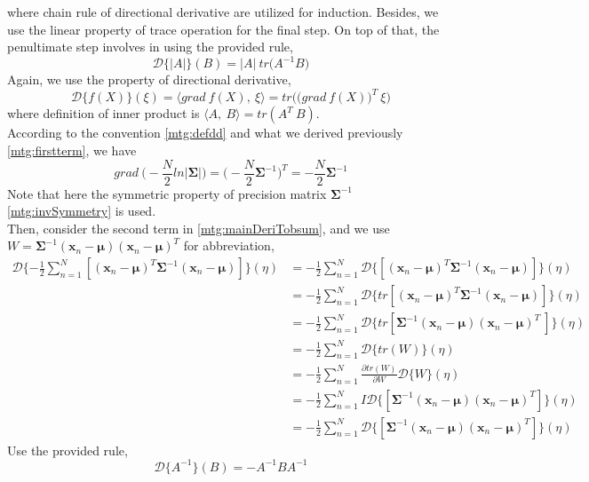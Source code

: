 \documentclass[11pt,a4paper]{article}
\newcommand{\htab}{\hspace*{0.63cm}}
\newcommand{\dd}[2]{\mathcal{D}\{ #1 \} (#2)}
\newcommand{\bmu}{\boldsymbol{\mu}}
\newcommand{\bsum}{\boldsymbol{\Sigma}}
\newcommand{\xnv}{\boldsymbol{x}_{n} }
\begin{document}
\htab where chain rule of directional derivative are utilized for induction. Besides, we use the linear property of trace operation for the final step. On top of that, the penultimate step involves in using the provided rule, 
    \begin{equation} 
        \dd{|A|}{B} = |A|\ tr \big(A^{-1} B\big)
    \end{equation}
\htab Again, we use the property of directional derivative,
    \begin{equation} \label{mtg:defdd}
        \dd{f(X)}{\xi} = \langle grad\ f(X),\ \xi  \rangle = tr \Big( \big(grad\ f(X)\big)^{T}\ \xi \Big)
    \end{equation}
\htab where definition of inner product is $\langle A,\ B\rangle = tr (A^{T}\ B)$. \\
\htab According to the convention \eqref{mtg:defdd} and what we derived previously \eqref{mtg:firstterm}, we have
    \begin{equation}
        grad\ \Big(- \frac{N}{2} ln|\bsum|\Big) = \Big(-\frac{N}{2} \bsum^{-1}\Big)^{T} = -\frac{N}{2} \bsum^{-1}
    \end{equation}
\htab Note that here the symmetric property of precision matrix $\bsum^{-1}$ \eqref{mtg:invSymmetry} is used.\\
\htab Then, consider the second term in \eqref{mtg:mainDeriTobsum}, and we use $ W = \bsum^{-1} (\xnv-\bmu) (\xnv-\bmu)^{T} $ for abbreviation,
        \begin{align}
        \dd{-\frac{1}{2} \sum_{n=1}^{N} [ (\xnv-\bmu)^{T} \bsum^{-1} (\xnv-\bmu)]}{\eta}
        & = -\frac{1}{2} \sum_{n=1}^{N} \dd{[ (\xnv-\bmu)^{T} \bsum^{-1} (\xnv-\bmu)]}{\eta} \\
        & = -\frac{1}{2} \sum_{n=1}^{N} \dd{tr[ (\xnv-\bmu)^{T} \bsum^{-1} (\xnv-\bmu)]}{\eta} \\
        & = -\frac{1}{2} \sum_{n=1}^{N} \dd{tr[ \bsum^{-1} (\xnv-\bmu) (\xnv-\bmu)^{T}\ ]}{\eta} \\
        & = -\frac{1}{2} \sum_{n=1}^{N} \dd{tr(W)}{\eta} \\
        & = -\frac{1}{2} \sum_{n=1}^{N} \frac{\partial tr(W)}{\partial W}\dd{W}{\eta} \\
        & = -\frac{1}{2} \sum_{n=1}^{N} I \dd{ [ \bsum^{-1} (\xnv-\bmu) (\xnv-\bmu)^{T} ]}{\eta} \\
        & = -\frac{1}{2} \sum_{n=1}^{N} \dd{ [ \bsum^{-1} (\xnv-\bmu) (\xnv-\bmu)^{T} ]}{\eta}
    \end{align}
\htab Use the provided rule, 
    \begin{equation} 
        \dd{A^{-1}}{B} = - A^{-1} B A^{-1}
    \end{equation}
\end{document}
